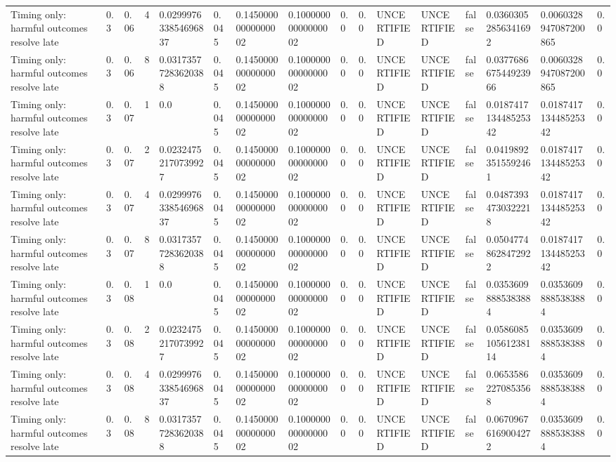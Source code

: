 \begin{tabular}{llllllllllllllll}
Timing only: harmful outcomes resolve late & 0.3 & 0.06 & 4 & 0.029997633854696837 & 0.045 & 0.14500000000000002 & 0.10000000000000002 & 0.0 & 0.0 & UNCERTIFIED & UNCERTIFIED & false & 0.03603052856341692 & 0.0060328947087200865 & 0.0 \\
Timing only: harmful outcomes resolve late & 0.3 & 0.06 & 8 & 0.03173577283620388 & 0.045 & 0.14500000000000002 & 0.10000000000000002 & 0.0 & 0.0 & UNCERTIFIED & UNCERTIFIED & false & 0.037768667544923966 & 0.0060328947087200865 & 0.0 \\
Timing only: harmful outcomes resolve late & 0.3 & 0.07 & 1 & 0.0 & 0.045 & 0.14500000000000002 & 0.10000000000000002 & 0.0 & 0.0 & UNCERTIFIED & UNCERTIFIED & false & 0.018741713448525342 & 0.018741713448525342 & 0.0 \\
Timing only: harmful outcomes resolve late & 0.3 & 0.07 & 2 & 0.02324752170739927 & 0.045 & 0.14500000000000002 & 0.10000000000000002 & 0.0 & 0.0 & UNCERTIFIED & UNCERTIFIED & false & 0.04198923515592461 & 0.018741713448525342 & 0.0 \\
Timing only: harmful outcomes resolve late & 0.3 & 0.07 & 4 & 0.029997633854696837 & 0.045 & 0.14500000000000002 & 0.10000000000000002 & 0.0 & 0.0 & UNCERTIFIED & UNCERTIFIED & false & 0.04873934730322218 & 0.018741713448525342 & 0.0 \\
Timing only: harmful outcomes resolve late & 0.3 & 0.07 & 8 & 0.03173577283620388 & 0.045 & 0.14500000000000002 & 0.10000000000000002 & 0.0 & 0.0 & UNCERTIFIED & UNCERTIFIED & false & 0.05047748628472922 & 0.018741713448525342 & 0.0 \\
Timing only: harmful outcomes resolve late & 0.3 & 0.08 & 1 & 0.0 & 0.045 & 0.14500000000000002 & 0.10000000000000002 & 0.0 & 0.0 & UNCERTIFIED & UNCERTIFIED & false & 0.03536098885383884 & 0.03536098885383884 & 0.0 \\
Timing only: harmful outcomes resolve late & 0.3 & 0.08 & 2 & 0.02324752170739927 & 0.045 & 0.14500000000000002 & 0.10000000000000002 & 0.0 & 0.0 & UNCERTIFIED & UNCERTIFIED & false & 0.058608510561238114 & 0.03536098885383884 & 0.0 \\
Timing only: harmful outcomes resolve late & 0.3 & 0.08 & 4 & 0.029997633854696837 & 0.045 & 0.14500000000000002 & 0.10000000000000002 & 0.0 & 0.0 & UNCERTIFIED & UNCERTIFIED & false & 0.06535862270853568 & 0.03536098885383884 & 0.0 \\
Timing only: harmful outcomes resolve late & 0.3 & 0.08 & 8 & 0.03173577283620388 & 0.045 & 0.14500000000000002 & 0.10000000000000002 & 0.0 & 0.0 & UNCERTIFIED & UNCERTIFIED & false & 0.06709676169004272 & 0.03536098885383884 & 0.0 \\

\end{tabular}
